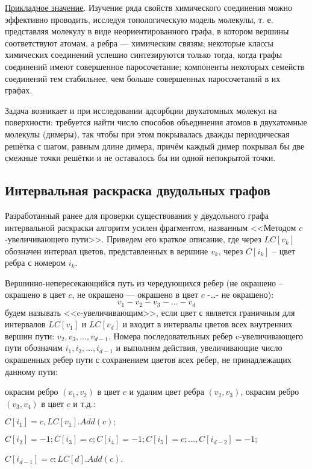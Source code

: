 \underline {Прикладное значение}. Изучение ряда свойств химического соединения можно эффективно проводить, исследуя топологическую модель молекулы, т. е. представляя молекулу в виде неориентированного графа, в котором вершины соответствуют атомам, а ребра — химическим связям; 
некоторые классы химических соединений успешно синтезируются только тогда, когда графы соединений имеют совершенное паросочетание; 
компоненты некоторых семейств соединений тем стабильнее, чем больше совершенных паросочетаний в их графах.
	
Задача возникает и при исследовании адсорбции двухатомных молекул на поверхности: требуется найти число способов объединения атомов в двухатомные молекулы (димеры), так чтобы при этом покрывалась дважды периодическая решётка с шагом, равным длине димера, причём каждый димер покрывал бы две смежные точки решётки и не оставалось бы ни одной непокрытой точки.


\subsection{Интервальная раскраска двудольных графов}

Разработанный ранее для проверки существования у двудольного графа  интервальной раскраски алгоритм усилен фрагментом, названным 
<<Методом $c$-увеличивающего пути>>. Приведем его краткое описание, где через $LC[v_k]$ обозначен интервал цветов, представленных в вершине $v_k$, через $C[i_k]$ -- цвет ребра с номером $i_k$.
 
Вершинно-непересекающийся путь из чередующихся ребер (не окрашено -- окрашено в цвет $c$, не окрашено --- окрашено в цвет $c$ -…-  не окрашено): 
$$v_1-v_2-v_3-\dots-v_d$$  
будем называть <<c-увеличивающим>>, если цвет $с$ является граничным для интервалов $LC[v_1]$ и $LC[v_d] $ и входит в интервалы цветов всех внутренних вершин пути: $v_2,v_3, \dots, v_{d-1}$. 
Номера последовательных ребер c-увеличивающего пути обозначим $i_1, i_2, \dots, i_{d-1}$ и выполним действия, увеличивающие число окрашенных ребер пути с сохранением цветов всех ребер, не принадлежащих данному пути:

окрасим ребро $(v_1,v_2)$ в цвет $c$ и удалим цвет ребра $(v_2,v_3)$, окрасим ребро $(v_3,v_4)$ в цвет $c$ и т.д.:

$C[i_1 ]=c, LC[v_1].Add(c);$

$C[i_2]=-1; C[i_3]=c; C[i_4 ]=-1; C[i_5 ]=c; \dots ,C[i_{d-2}]=-1;$

$C[i_{d-1}]=c; LC[d].Add(c)$.

